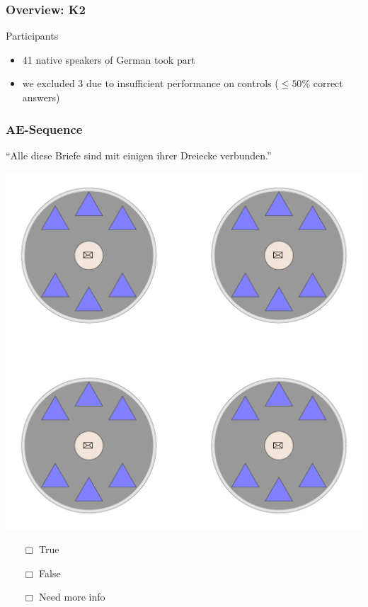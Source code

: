 \documentclass[fleqn,10pt,serif,xcolor=dvipsnames]{beamer}
\renewcommand{\AE}{AE}
\newcommand{\mymark}[1]{{\color{blue}{#1}}}
\begin{document}
\begin{frame}
  \frametitle{Overview: K2}
  \begin{block}{Participants}
    \begin{itemize}
    \item 41 native speakers of German took part
    \item we excluded 3 due to insufficient performance on controls
      ($\le 50\%$ correct answers)
    \end{itemize}
  \end{block}
\end{frame}

\begin{frame}
  \frametitle{\AE-Sequence}
  \begin{center}
    ``Alle diese Briefe sind mit einigen ihrer Dreiecke verbunden.''

    \vspace{0.1cm}

    \includegraphics[width=0.5 \textwidth]{../../pictures/ae_01_1.pdf}

    \vspace{0.1cm}

    \begin{multicols}{3}
      \begin{itemize} 
      \item[$\Box$] True\\
        \onslide<2>{$\leadsto$  \mymark{false}}
      \item[$\Box$] False\\
        \onslide<2>{$\leadsto$ \mymark{false}}
      \item[$\Box$] Need more info 
      \end{itemize}
    \end{multicols}

  \end{center}
\end{frame}
\end{document}
